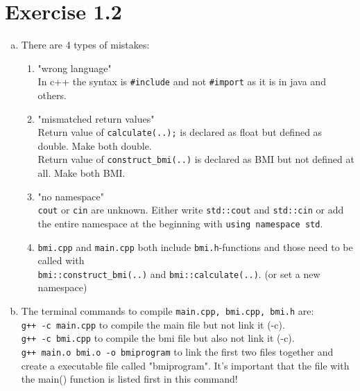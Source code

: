 \documentclass{article} %
\newcommand{\homeworkNumber}{1} %
\begin{document}
\clearpage

\section*{Exercise \homeworkNumber.2}
\begin{enumerate}[(a)]
    \item There are 4 types of mistakes:
    \begin{enumerate}[1.]
        \item "wrong language"\\
        In c++ the syntax is \verb|#include| and not \verb|#import| as it is in java and others.
        
        \item "mismatched return values"\\
        Return value of \verb|calculate(..);| is declared as float but defined as double. Make both double.\\
        Return value of \verb|construct_bmi(..)| is declared as BMI but not defined at all. Make both BMI. 
        
        \item "no namespace"\\
        \verb|cout| or \verb|cin| are unknown. Either write \verb|std::cout| and \verb|std::cin| or add the entire namespace at the beginning with \verb|using namespace std|.
        
        \item \verb|bmi.cpp| and \verb|main.cpp| both include \verb|bmi.h|-functions and those need to be called
        with \\ \verb|bmi::construct_bmi(..)| and \verb|bmi::calculate(..)|. (or set a new namespace)
    \end{enumerate}
    \item The terminal commands to compile \verb|main.cpp, bmi.cpp, bmi.h| are: \\
    \verb|g++ -c main.cpp| to compile the main file but not link it (-c).\\
    \verb|g++ -c bmi.cpp| to compile the bmi file but also not link it (-c).\\
    \verb|g++ main.o bmi.o -o bmiprogram| to link the first two files together and create a executable file called "bmiprogram". It's important that the file with the main() function is listed first in this command!
\end{enumerate}
\clearpage
\end{document}
